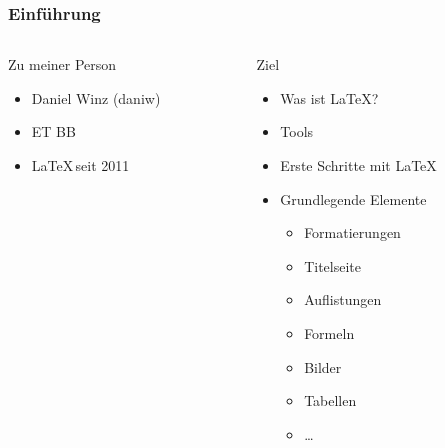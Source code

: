 \begin{frame}
    \frametitle{Einführung}
    \begin{columns}
        \begin{column}{0.50\textwidth}
            \begin{block}{Zu meiner Person}
                \begin{itemize}
                    \item Daniel Winz (daniw)
                    \item ET BB
                    \item \LaTeX \,seit 2011
                \end{itemize}
            \end{block}
        \end{column}
        \pause
        \begin{column}{0.50\textwidth}
            \begin{block}{Ziel}
                \begin{itemize}
                    \item Was ist \LaTeX?
                    \item Tools
                    \item Erste Schritte mit \LaTeX
                    \item Grundlegende Elemente
                    \begin{itemize}
                        \item Formatierungen
                        \item Titelseite
                        \item Auflistungen
                        \item Formeln
                        \item Bilder
                        \item Tabellen
                        \item \ldots
                    \end{itemize}
                \end{itemize}
            \end{block}
        \end{column}
    \end{columns}
\end{frame}
